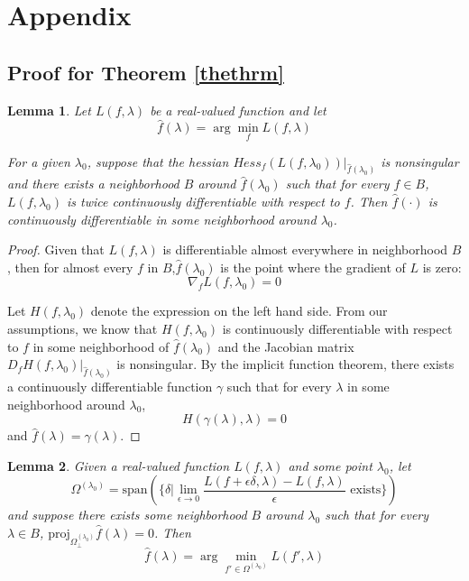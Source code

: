 \documentclass[10pt,letterpaper]{article}
\newtheorem{lemma}{Lemma}
\begin{document}
\section*{Appendix}

\subsection{Proof for Theorem \ref{thethrm}}

\begin{lemma}
Let $L(f, \lambda)$ be a real-valued function and let
\begin{equation}
\hat f(\lambda) = \arg\min_f L(f, \lambda)
\end{equation}

For a given $\lambda_0$, suppose that the hessian $Hess_f(L(f, \lambda_0))|_{\hat f(\lambda_0)}$ is nonsingular and there exists a neighborhood $B$ around $\hat f(\lambda_0)$ such that for every $f \in B$, $L(f, \lambda_0)$ is twice continuously differentiable with respect to $f$. Then $\hat f(\cdot)$ is continuously differentiable in some neighborhood around $\lambda_0$.
\label{lemma1}
\end{lemma}

\begin{proof}
Given that $L(f, \lambda)$ is differentiable almost everywhere in neighborhood $B$, then for almost every $f$ in $B$,$\hat f(\lambda_0)$ is the point where the gradient of $L$ is zero:
\begin{equation}
\nabla_{f} L(f, \lambda_0) = 0
\end{equation}

Let $H(f, \lambda_0)$ denote the expression on the left hand side. From our assumptions, we know that $H(f, \lambda_0)$ is continuously differentiable with respect to $f$ in some neighborhood of $\hat f(\lambda_0)$ and the Jacobian matrix $D_f H(f, \lambda_0) |_{\hat f(\lambda_0)}$ is nonsingular. By the implicit function theorem, there exists a continuously differentiable function $\gamma$ such that for every $\lambda$ in some neighborhood around $\lambda_0$,
\begin{equation}
H(\gamma(\lambda), \lambda) = 0
\end{equation}
and
$\hat f(\lambda) = \gamma(\lambda)$.

\end{proof}

\begin{lemma}
Given a real-valued function $L(f, \lambda)$ and some point $\lambda_0$, let
\begin{equation}
\Omega^{(\lambda_0)} = \text{span}(\{\delta | \lim_{\epsilon \rightarrow 0} \frac{L(f + \epsilon \delta, \lambda) - L(f, \lambda)}{\epsilon} \text{ exists} \})
\end{equation}
and suppose there exists some neighborhood $B$ around $\lambda_0$ such that for every $\lambda \in B$, $\text{proj}_{\Omega_{\bot}^{(\lambda_0)}} \hat f(\lambda)=0$. Then
\begin{equation}
\hat f(\lambda) = \arg \min_{f' \in \Omega^{(\lambda_0)}} L(f', \lambda)
\end{equation}
\label{lemma2}
\end{lemma}
\end{document}
